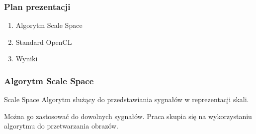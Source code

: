 
\begin{frame}
\frametitle{Plan prezentacji}

\begin{enumerate}
\item Algorytm Scale Space
\item Standard OpenCL
\item Wyniki
\end{enumerate}

\end{frame}




\begin{frame}
\frametitle{Algorytm Scale Space}
\begin{block}{Scale Space}
Algorytm służący do przedstawiania sygnałów w reprezentacji skali.
\end{block}
Można go zastosować do dowolnych sygnałów. Praca skupia się na wykorzystaniu algorytmu do przetwarzania obrazów.

\end{frame}

